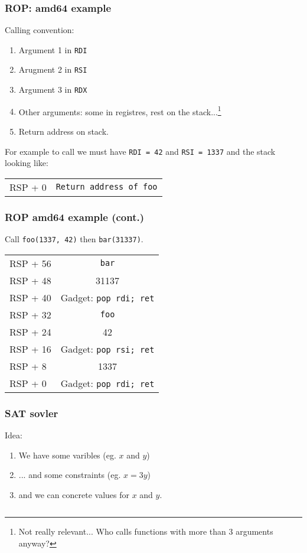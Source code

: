 \documentclass{beamer}
\begin{document}
\begin{frame}
    \frametitle{ROP: amd64 example}
    Calling convention:
    \begin{enumerate}
        \item Argument 1 in \texttt{RDI}
        \item Arugment 2 in \texttt{RSI}
        \item Argument 3 in \texttt{RDX}
        \item Other arguments: some in registres, rest on the stack...\footnote{Not really relevant... Who calls functions with more than 3 arguments anyway?}
        \item Return address on stack.
    \end{enumerate}
    \pause For example to call 
    \pause we must have \texttt{RDI = 42}
    \pause and \texttt{RSI = 1337}
    \pause and the stack looking like:
    \begin{center}
    \begin{tabular}{l|c}
        RSP + 0  & \texttt{Return address of foo}
    \end{tabular}
    \end{center}
\end{frame}

\begin{frame}
    \frametitle{ROP amd64 example (cont.)}
    Call \texttt{foo(1337, 42)} then \texttt{bar(31337)}.
    \begin{center}
    \begin{tabular}{l|c}
        RSP + 56 & \texttt{bar} \\
        RSP + 48 & 31137 \\
        RSP + 40 & Gadget: \texttt{pop rdi; ret} \\
        RSP + 32 & \texttt{foo} \\
        RSP + 24 & 42 \\
        RSP + 16 & Gadget: \texttt{pop rsi; ret} \\
        RSP + 8  & 1337 \\
        RSP + 0  & Gadget: \texttt{pop rdi; ret} \\
    \end{tabular}
    \end{center}
\end{frame}


\begin{frame}
    \frametitle{SAT sovler}

    Idea:
    \begin{enumerate}
        \item We have some varibles (eg. $x$ and $y$)
        \item ... and some constraints (eg. $x = 3y$)
        \item and we can concrete values for $x$ and $y$.
    \end{enumerate}

    \begin{lstlisting}
    \end{lstlisting}
    
\end{frame}
\end{document}
